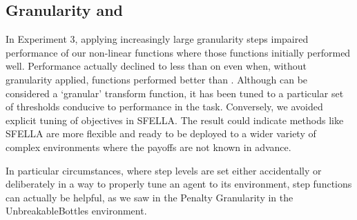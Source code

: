 








\subsection{Granularity and \tloA{}}

In Experiment 3, applying increasingly large granularity steps impaired performance of our non-linear functions where those functions initially performed well. Performance actually declined to less than \tloA{} on even when, without granularity applied, functions performed better than \tloA{}. Although \tloA{} can be considered a `granular' transform function, it has been tuned to a particular set of thresholds conducive to performance in the task. Conversely, we avoided explicit tuning of objectives in SFELLA. The result could indicate methods like SFELLA are more flexible and ready to be deployed to a wider variety of complex environments where the payoffs are not known in advance.

In particular circumstances, where step levels are set either accidentally or deliberately in a way to properly tune an agent to its environment, step functions can actually be helpful, as we saw in the Penalty Granularity in the UnbreakableBottles environment.

